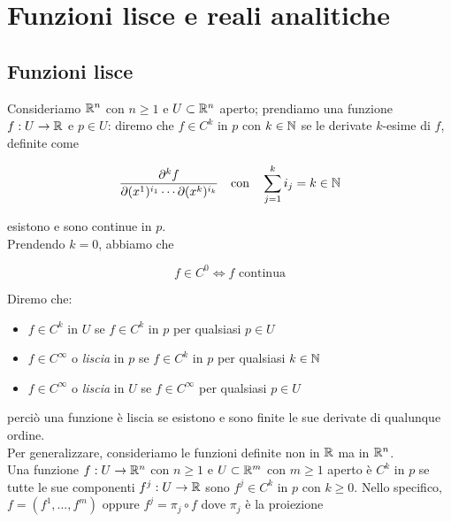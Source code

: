 \section{Funzioni lisce e reali analitiche}

\subsection{Funzioni lisce}

Consideriamo $ \mathbb{R}^{n} $ con $ n \geqslant 1 $ e $ U \subset \mathbb{R}^{n} $ aperto; prendiamo una funzione $ f : U \to \mathbb{R} $ e $ p \in U $: diremo che $ f \in C^{k} $ in $ p $ con $ k \in \mathbb{N} $ se le derivate $ k $-esime di $ f $, definite come

\begin{equation}
	\dfrac{\partial^{k} f}{\partial (x^{1})^{i_{1}} \cdots \partial (x^{k})^{i_{k}}} \qq{con} \sum_{j=1}^{k} i_{j} = k \in \N
\end{equation}

esistono e sono continue in $ p $. \\
Prendendo $ k = 0 $, abbiamo che

\begin{equation}
	f \in C^{0} \iff f \text{ continua}
\end{equation}

Diremo che:

\begin{itemize}
	\item $ f \in C^{k} $ in $ U $ se $ f \in C^{k} $ in $ p $ per qualsiasi $ p \in U $
	
	\item $ f \in C^{\infty} $ o \textit{liscia} in $ p $ se $ f \in C^{k} $ in $ p $ per qualsiasi $ k \in \mathbb{N} $
	
	\item $ f \in C^{\infty} $ o \textit{liscia} in $ U $ se $ f \in C^{\infty} $ per qualsiasi $ p \in U $
\end{itemize}

perciò una funzione è liscia se esistono e sono finite le sue derivate di qualunque ordine. \\
Per generalizzare, consideriamo le funzioni definite non in $ \mathbb{R} $ ma in $ \mathbb{R}^{n} $. \\
Una funzione $ f : U \to \mathbb{R}^{n} $ con $ n \geqslant 1 $ e $ U \subset \mathbb{R}^{m} $ con $ m \geqslant 1 $ aperto è $ C^{k} $ in $ p $ se tutte le sue componenti $ f^{j} : U \to \mathbb{R} $ sono $ f^{j} \in C^{k} $ in $ p $ con $ k \geqslant 0 $. Nello specifico, $ f = (f^{1}, \dots, f^{m}) $ oppure $ f^{j} = \pi_{j} \circ f $ dove $ \pi_{j} $ è la proiezione

